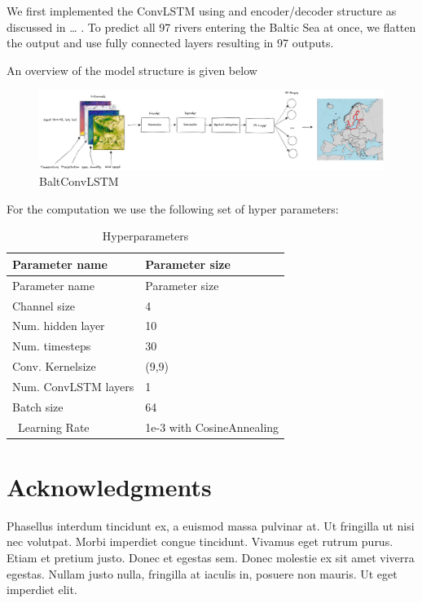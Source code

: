 \documentclass[
]{agujournal2019}
\begin{document}
We first implemented the ConvLSTM using and encoder/decoder structure as
discussed in \ldots{} . To predict all 97 rivers entering the Baltic Sea
at once, we flatten the output and use fully connected layers resulting
in 97 outputs.

An overview of the model structure is given below

\begin{figure}

{\centering \includegraphics{model_structure.png}

}

\caption{\label{fig-baltNet}BaltConvLSTM}

\end{figure}

For the computation we use the following set of hyper parameters:

\hypertarget{tbl-letters}{}
\begin{longtable}[]{@{}ll@{}}
\caption{\label{tbl-letters}Hyperparameters}\tabularnewline
\toprule()
Parameter name & Parameter size \\
\midrule()
\endfirsthead
\toprule()
Parameter name & Parameter size \\
\midrule()
\endhead
Channel size & 4 \\
Num. hidden layer & 10 \\
Num. timesteps & 30 \\
Conv. Kernelsize & (9,9) \\
Num. ConvLSTM layers & 1 \\
Batch size & 64 \\
~Learning Rate & 1e-3 with CosineAnnealing \\
\bottomrule()
\end{longtable}

\hypertarget{acknowledgments}{%
\section{Acknowledgments}\label{acknowledgments}}

Phasellus interdum tincidunt ex, a euismod massa pulvinar at. Ut
fringilla ut nisi nec volutpat. Morbi imperdiet congue tincidunt.
Vivamus eget rutrum purus. Etiam et pretium justo. Donec et egestas sem.
Donec molestie ex sit amet viverra egestas. Nullam justo nulla,
fringilla at iaculis in, posuere non mauris. Ut eget imperdiet elit.
\end{document}
